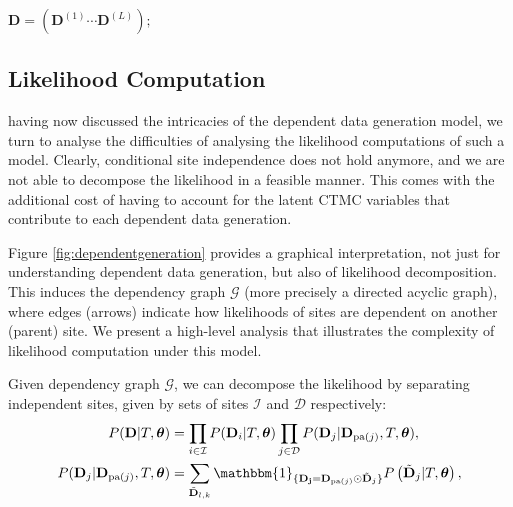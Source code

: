 \begin{algorithm}
\Return $\mathbf{D} = (\mathbf{D}^{(1)} \cdots \mathbf{D}^{(L)});$


 \caption{Dependent Data Generation using ZIP branching process and product of binary CTMCs.}
 \label{algo:dependentdatageneration}
\end{algorithm}

\subsection{Likelihood Computation}
\label{sec:likelihoodcomp}
having now discussed the intricacies of the dependent data generation model, we turn to analyse the difficulties of analysing the likelihood computations of such a model. Clearly, conditional site independence does not hold anymore, and we are not able to decompose the likelihood in a feasible manner. This comes with the additional cost of having to account for the latent CTMC variables that contribute to each dependent data generation. 

Figure \ref{fig:dependentgeneration} provides a graphical interpretation, not just for understanding dependent data generation, but also of likelihood decomposition. This induces the dependency graph $\mathcal{G}$ (more precisely a directed acyclic graph), where edges (arrows) indicate how likelihoods of sites are dependent on another (parent) site. We present a high-level analysis that illustrates the complexity of likelihood computation under this model.

Given dependency graph $\mathcal{G}$, we can decompose the likelihood by separating independent sites, given by sets of sites $\mathcal{I}$ and $\mathcal{D}$ respectively:
\begin{align}
     P(\mathbf{D} | T, \boldsymbol{\theta}) &= \prod_{i\in\mathcal{I}}P(\mathbf{D}_i|T, \boldsymbol{\theta})\prod_{j\in\mathcal{D}}P(\mathbf{D}_j|\mathbf{D}_{\text{pa}(j)}, T, \boldsymbol{\theta}), \label{eq:dependentlikelihood} \\
     P(\mathbf{D}_j|\mathbf{D}_{\text{pa}(j)}, T, \boldsymbol{\theta}) &= \sum_{\tilde{\mathbf{D}}_{l, k}}\mathbbm{1}_{\{\mathbf{D_j} = \mathbf{D}_{\text{pa}(j)} \odot \tilde{\mathbf{D}}_j\}}P\left(\tilde{\mathbf{D}}_{j}|T, \boldsymbol{\theta}\right),\label{eq:dependencyctmccalculation}
\end{align}

